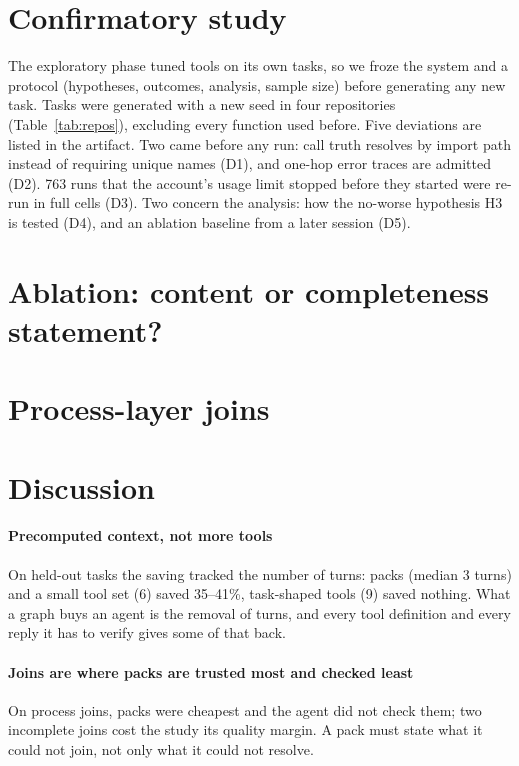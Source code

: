 \documentclass[conference]{IEEEtran}
\begin{document}
\section{Confirmatory study}\label{sec:confirmatory}
The exploratory phase tuned tools on its own tasks, so we froze the system and a protocol (hypotheses, outcomes,
analysis, sample size) before generating any new task. Tasks were generated with a new seed in four repositories
(Table~\ref{tab:repos}), excluding every function used before. Five deviations are listed in the artifact. Two came
before any run: call truth resolves by import path instead of requiring unique names (D1), and one-hop error traces are
admitted (D2). 763 runs that the account's usage limit stopped before they started were re-run in full cells (D3).
Two concern the analysis: how the no-worse hypothesis H3 is tested (D4), and an ablation baseline from a later
session (D5).




\section{Ablation: content or completeness statement?}\label{sec:ablation}


\section{Process-layer joins}\label{sec:process}


\section{Discussion}
\paragraph{Precomputed context, not more tools} On held-out tasks the saving tracked the number of turns: packs (median 3
turns) and a small tool set (6) saved 35--41\%, task-shaped tools (9) saved nothing. What a graph buys an agent is the
removal of turns, and every tool definition and every reply it has to verify gives some of that back.
\paragraph{Joins are where packs are trusted most and checked least} On process joins, packs were cheapest and the
agent did not check them; two incomplete joins cost the study its quality margin. A pack must state what it could not
join, not only what it could not resolve.
\end{document}
